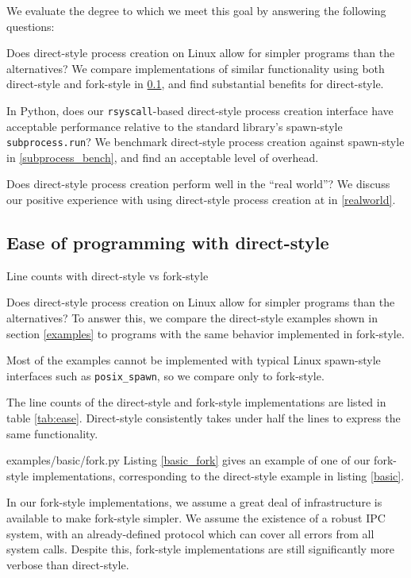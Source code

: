 \documentclass[letterpaper,twocolumn,10pt]{article}
\begin{document}
We evaluate the degree to which we meet this goal by answering the following questions:
\begin{compactitem}
\item
  Does direct-style process creation on Linux allow for simpler programs than the alternatives?
  We compare implementations of similar functionality using both direct-style and fork-style in \ref{ease},
  and find substantial benefits for direct-style.
\item
  In Python, does our \texttt{rsyscall}-based direct-style process creation interface
  have acceptable performance relative to the standard library's spawn-style \texttt{subprocess.run}?
  We benchmark direct-style process creation against spawn-style in \ref{subprocess_bench},
  and find an acceptable level of overhead.
\item
  Does direct-style process creation perform well in the ``real world''?
  We discuss our positive experience with using direct-style process creation at \twosigma in \ref{realworld}.
\end{compactitem}
\subsection{Ease of programming with direct-style}\label{ease}
\begin{table}

\caption{Line counts with direct-style vs fork-style}
\label{tab:ease}
\end{table}
Does direct-style process creation on Linux allow for simpler programs than the alternatives?
To answer this, we compare the direct-style examples shown in section \ref{examples}
to programs with the same behavior implemented in fork-style.

Most of the examples cannot be implemented with typical Linux spawn-style interfaces such as \verb|posix_spawn|,
so we compare only to fork-style.

The line counts of the direct-style and fork-style implementations are listed in table \ref{tab:ease}.
Direct-style consistently takes under half the lines to express the same functionality.


{examples/basic/fork.py}
Listing \ref{basic_fork} gives an example of one of our fork-style implementations,
corresponding to the direct-style example in listing \ref{basic}.

In our fork-style implementations,
we assume a great deal of infrastructure is available to make fork-style simpler.
We assume the existence of a robust IPC system,
with an already-defined protocol which can cover all errors from all system calls.
Despite this, fork-style implementations are still significantly more verbose than direct-style.
\end{document}
